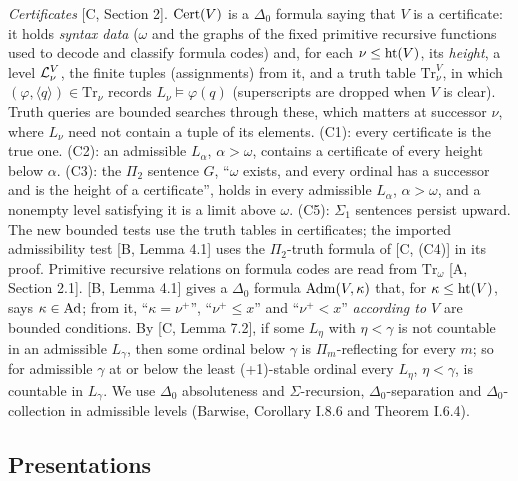 \documentclass[11pt]{article}
\begin{document}
\emph{Certificates} [C, Section 2]. $\mathrm{Cert}(V)$ is a $\Delta_0$ formula saying that $V$ is a certificate: it holds
\emph{syntax data} ($\omega$ and the graphs of the fixed primitive recursive functions used to decode and classify formula codes) and, for each $\nu \le \mathrm{ht}(V)$,
its \emph{height}, a level $\mathcal{L}^V_\nu$, the finite tuples (assignments) from it, and a truth table $\mathrm{Tr}^V_\nu$,
in which $(\varphi, \langle q\rangle) \in \mathrm{Tr}_\nu$ records $L_\nu \models \varphi(q)$ (superscripts are dropped
when $V$ is clear). Truth queries are bounded searches through these, which matters at successor $\nu$, where $L_\nu$
need not contain a tuple of its elements. (C1): every certificate is the true one. (C2): an admissible $L_\alpha$,
$\alpha > \omega$, contains a certificate of every height below $\alpha$. (C3): the $\Pi_2$ sentence $G$, ``$\omega$
exists, and every ordinal has a successor and is the height of a certificate'', holds in every admissible $L_\alpha$,
$\alpha > \omega$, and a nonempty level satisfying it is a limit above $\omega$. (C5): $\Sigma_1$ sentences persist
upward. The new bounded tests use the truth tables in certificates; the imported admissibility test [B, Lemma 4.1]
uses the $\Pi_2$-truth formula of [C, (C4)] in its proof. Primitive recursive relations on formula codes are read
from $\mathrm{Tr}_\omega$ [A, Section 2.1]. [B, Lemma 4.1] gives a $\Delta_0$ formula $\mathrm{Adm}(V,\kappa)$ that, for
$\kappa \le \mathrm{ht}(V)$, says $\kappa \in \mathrm{Ad}$; from it, ``$\kappa = \nu^+$'', ``$\nu^+ \le x$'' and ``$\nu^+ < x$''
\emph{according to $V$} are bounded conditions. By [C, Lemma 7.2], if some $L_\eta$ with $\eta < \gamma$ is not
countable in an admissible $L_\gamma$, then some ordinal below $\gamma$ is $\Pi_m$-reflecting for every $m$; so for
admissible $\gamma$ at or below the least (+1)-stable ordinal every $L_\eta$, $\eta < \gamma$, is countable in $L_\gamma$. We use $\Delta_0$ absoluteness and $\Sigma$-recursion,
$\Delta_0$-separation and $\Delta_0$-collection in admissible levels (Barwise, Corollary I.8.6 and Theorem I.6.4).

\subsection{Presentations}
\end{document}
